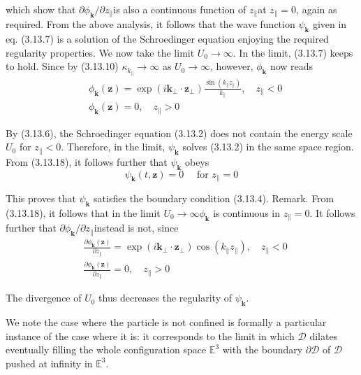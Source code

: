 \documentclass{article}
\begin{document}
which show that $\partial \phi_{\boldsymbol{k}} / \partial z_{\|}$is also a continuous function of $z_{\|}$at $z_{\|}=0$, again as required.
From the above analysis, it follows that the wave function $\psi_{\boldsymbol{k}}$ given in eq. (3.13.7) is a solution of the Schroedinger equation enjoying the required regularity properties. We now take the limit $U_{0} \rightarrow \infty$. In the limit, (3.13.7) keeps to hold. Since by (3.13.10) $\kappa_{k_{\|}} \rightarrow \infty$ as $U_{0} \rightarrow \infty$, however, $\phi_{\boldsymbol{k}}$ now reads
$$
\begin{align*}
& \phi_{\boldsymbol{k}}(\boldsymbol{z})=\exp \left(i \boldsymbol{k}_{\perp} \cdot \boldsymbol{z}_{\perp}\right) \frac{\sin \left(k_{\|} z_{\|}\right)}{k_{\|}}, \quad z_{\|}<0  \tag{3.13.18}\\
& \phi_{\boldsymbol{k}}(\boldsymbol{z})=0, \quad z_{\|}>0
\end{align*}
$$

By (3.13.6), the Schroedinger equation (3.13.2) does not contain the energy scale $U_{0}$ for $z_{\|}<0$. Therefore, in the limit, $\psi_{\boldsymbol{k}}$ solves (3.13.2) in the same space region. From (3.13.18), it follows further that $\psi_{\boldsymbol{k}}$ obeys
$$
\begin{equation*}
\psi_{\boldsymbol{k}}(t, \boldsymbol{z})=0 \quad \text { for } z_{\|}=0 \tag{3.13.19}
\end{equation*}
$$

This proves that $\psi_{\boldsymbol{k}}$ satisfies the boundary condition (3.13.4).
Remark. From (3.13.18), it follows that in the limit $U_{0} \rightarrow \infty \phi_{\boldsymbol{k}}$ is continuous in $z_{\|}=0$. It follows further that $\partial \phi_{\boldsymbol{k}} / \partial z_{\|}$instead is not, since
$$
\begin{align*}
& \frac{\partial \phi_{\boldsymbol{k}}(\boldsymbol{z})}{\partial z_{\|}}=\exp \left(i \boldsymbol{k}_{\perp} \cdot \boldsymbol{z}_{\perp}\right) \cos \left(k_{\|} z_{\|}\right), \quad z_{\|}<0  \tag{3.13.20}\\
& \frac{\partial \phi_{\boldsymbol{k}}(\boldsymbol{z})}{\partial z_{\|}}=0, \quad z_{\|}>0
\end{align*}
$$

The divergence of $U_{0}$ thus decreases the regularity of $\psi_{\boldsymbol{k}}$.

We note the case where the particle is not confined is formally a particular instance of the case where it is: it corresponds to the limit in which $\mathcal{D}$ dilates eventually filling the whole configuration space $\mathbb{E}^{3}$ with the boundary $\partial \mathcal{D}$ of $\mathcal{D}$ pushed at infinity in $\mathbb{E}^{3}$.
\end{document}
